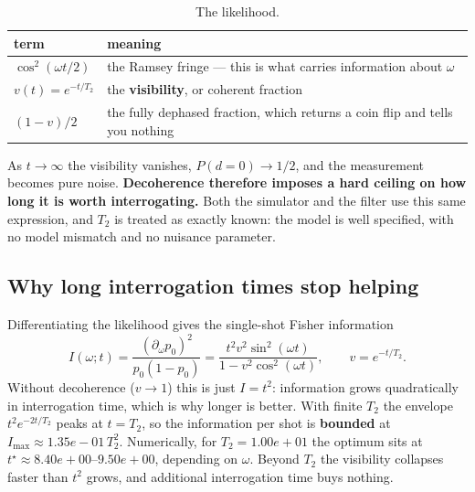 \documentclass[12pt,a4paper]{article}
\begin{document}
\begin{table}[H]
  \centering
  \caption{The likelihood.}
  \label{tab:the-likelihood}
  \small
  \begin{tabular}{@{}>{\raggedright\arraybackslash}p{}
                    >{\raggedright\arraybackslash}p{}@{}}
    \toprule
    term & meaning \\
    \midrule
    $\cos^{2}(\omega t/2)$ & the Ramsey fringe --- this is what carries
                             information about $\omega$ \\
    $v(t) = e^{-t/T_2}$ & the \textbf{visibility}, or coherent fraction \\
    $(1-v)/2$ & the fully dephased fraction, which returns a coin flip and
                tells you nothing \\
    \bottomrule
  \end{tabular}
\end{table}

As $t \to \infty$ the visibility vanishes, $P(d=0) \to 1/2$, and the
measurement becomes pure noise. \textbf{Decoherence therefore imposes a hard
ceiling on how long it is worth interrogating.} Both the simulator and the
filter use this same expression, and $T_2$ is treated as exactly known: the
model is well specified, with no model mismatch and no nuisance parameter.

\subsection{Why long interrogation times stop helping}
\label{sec:fisher}
Differentiating the likelihood gives the single-shot Fisher information
\begin{equation}
  I(\omega; t) = \frac{(\partial_\omega p_0)^{2}}{p_0(1-p_0)}
               = \frac{t^{2} v^{2} \sin^{2}(\omega t)}
                      {1 - v^{2}\cos^{2}(\omega t)},
  \qquad v = e^{-t/T_2}.
  \label{eq:fisher}
\end{equation}
Without decoherence ($v \to 1$) this is just $I = t^2$: information grows
quadratically in interrogation time, which is why longer is better. With
finite $T_2$ the envelope $t^{2}e^{-2t/T_2}$ peaks at $t = T_2$, so the
information per shot is \textbf{bounded} at
$I_{\max} \approx 1.35e-01\,T_2^{2}$. Numerically, for $T_2 = 1.00e+01$ the
optimum sits at $t^{\star} \approx 8.40e+00$--$9.50e+00$, depending on
$\omega$. Beyond $T_2$ the visibility collapses faster than $t^2$ grows, and
additional interrogation time buys nothing.
\end{document}
